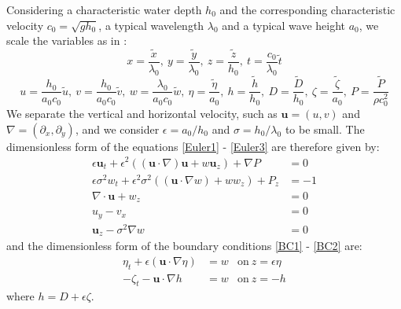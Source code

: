 \documentclass[11pt,a4paper]{article}
\begin{document}
			Considering a characteristic water depth $h_0$ and the corresponding 	characteristic velocity $c_0 = \sqrt{g h_0}$, a typical wavelength $\lambda_0$ and a typical wave height $a_0$, we scale the variables as in \cite{DM2013}: 
			\begin{equation*}
				x = \frac{\tilde{x}}{\lambda_0},\: 
				y = \frac{\tilde{y}}{\lambda_0}, \:
				z = \frac{\tilde{z}}{h_0}, \: 
				t = \frac{c_0}{\lambda_0}\tilde{t}
			\end{equation*}
			\begin{equation*}
				u = \frac{h_0}{a_0 c_0} \tilde{u},\:
				v = \dfrac{h_0}{a_0 c_0} \tilde{v},\:
				w = \dfrac{\lambda_0}{a_0 c_0} \tilde{w},\: 
				\eta = \dfrac{\tilde{\eta}}{a_0},\: 
				h = \dfrac{\tilde{h}}{h_0},\:
				D = \dfrac{\tilde{D}}{h_0}, \:
				\zeta = \dfrac{\tilde{\zeta}}{a_0},\:
				P = \dfrac{\tilde{P}}{\rho c_0^2}				
			\end{equation*}
			We separate the vertical and horizontal velocity, such as $\mathbf{u} = (u,v)$ and $\nabla = (\partial_x,\partial_y)$, and we consider $\epsilon = a_0 / h_0$ and $\sigma = h_0 / \lambda_0$ to be small. The dimensionless form of the equations \eqref{Euler1} - \eqref{Euler3} are therefore given by: 
			\begin{align}
				\epsilon \mathbf{u}_t + \epsilon^2((\mathbf{u} \cdot \nabla) \mathbf{u} + w \mathbf{u}_z) + \nabla P & = 0 \label{MConsxy}\\
				\epsilon \sigma^2 w_t + \epsilon^2 \sigma^2 ((\mathbf{u} \cdot \nabla w) + w w_z) + P_z & = -1 \label{MConsz}\\
				\nabla \cdot \mathbf{u} + w_z & =  0 \label{MassCons}\\
				u_y-v_x & = 0 \label{Irrxy}\\
				\mathbf{u}_z - \sigma^2 \nabla w & = 0 \label{Irrz}
			\end{align}
			and the dimensionless form of the boundary conditions \eqref{BC1} - \eqref{BC2} are: 
			\begin{align}
				\eta_t + \epsilon (\mathbf{u} \cdot \nabla \eta ) & = w & \mathrm{on} \: z =\epsilon \eta \label{BCH}\\
				- \zeta_t - \mathbf{u} \cdot \nabla h & = w & \mathrm{on} \:  z = -h
				\label{BCB}
			\end{align}
			where $h = D + \epsilon \zeta $.
			
\end{document}
